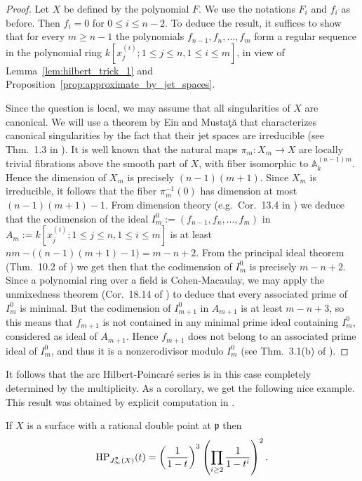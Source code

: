 \begin{proof}
Let $X$ be defined by the polynomial $F$. We use the notations $F_i$ and $f_i$ as before. Then $f_i = 0$ for $0\leq i \leq n-2$. To deduce the result, it suffices to show that for every $m\geq n-1$ the polynomials $f_{n-1}, f_n, \ldots , f_m$ form a regular sequence in the polynomial ring $k[x_j^{(i)};1\leq j \leq n, 1\leq i\leq m]$, in view of Lemma~\ref{lem:hilbert_trick_1} and Proposition~\ref{prop:approximate_by_jet_spaces}. 

Since the question is local, we may assume that all singularities of $X$ are canonical. We will use a theorem by Ein and Musta\c{t}\u{a} that characterizes canonical singularities by the fact that their jet spaces are irreducible (see Thm.\ 1.3 in \cite{ein_mustata}). It is well known that the natural maps $\pi_m : X_m \to X$ are locally trivial fibrations above the smooth part of $X$, with fiber isomorphic to $\mathbb{A}_k^{(n-1)m}$. Hence the dimension of $X_m$ is precisely $(n-1)(m+1)$. Since $X_m$ is irreducible, it follows that the fiber $\pi_m^{-1}(0)$ has dimension at most $(n-1)(m+1)-1$. From dimension theory (e.g.\ Cor.\ 13.4 in \cite{eisenbud_commalg}) we deduce that the codimension of the ideal $I_m^{0}:=(f_{n-1}, f_n, \ldots , f_m)$ in $A_m:=k[x_j^{(i)};1\leq j \leq n, 1\leq i\leq m]$ is at least $nm - \bigl((n-1)(m+1) - 1\bigr) = m-n+2$. From the principal ideal theorem (Thm.\ 10.2 of \cite{eisenbud_commalg}) we get then that the codimension of $I_m^{0}$ is precisely $m-n+2$. Since a polynomial ring over a field is Cohen-Macaulay, we may apply the unmixedness theorem (Cor.\ 18.14 of \cite{eisenbud_commalg}) to deduce that every associated prime of $I_m^{0}$ is minimal. But the codimension of $I_{m+1}^{0}$ in $A_{m+1}$ is at least $m-n+3$, so this means that $f_{m+1}$ is not contained in any minimal prime ideal containing $I_m^{0}$, considered as ideal of $A_{m+1}$. Hence $f_{m+1}$ does not belong to an associated prime ideal of $I_m^{0}$, and thus it is a nonzerodivisor modulo $I_m^{0}$ (see Thm.\ 3.1(b) of \cite{eisenbud_commalg}).
\end{proof}

It follows that the arc Hilbert-Poincar\'{e} series is in this case completely determined by the multiplicity. As a corollary, we get the following nice example. This result was obtained by explicit computation in \cite{mourtada_thesis}.

\begin{Cor}\label{cor:rational_double_point}
If $X$ is a surface with a rational double point at $\mathfrak{p}$ then 
\[ \operatorname{HP}_{J_{\infty}^{\mathfrak{p}}(X)}(t) =  \left(\frac{1}{1-t}\right)^{3} \left(\prod_{i\geq 2} \frac{1}{1-t^i}\right)^2.\]
\end{Cor}

